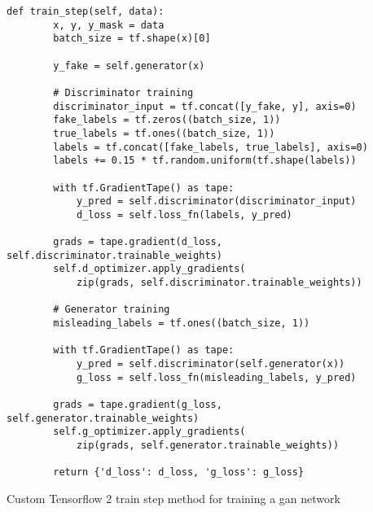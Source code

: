 \begin{listing}
\begin{verbatim}
def train_step(self, data):
        x, y, y_mask = data
        batch_size = tf.shape(x)[0]

        y_fake = self.generator(x)

        # Discriminator training
        discriminator_input = tf.concat([y_fake, y], axis=0)
        fake_labels = tf.zeros((batch_size, 1))
        true_labels = tf.ones((batch_size, 1))
        labels = tf.concat([fake_labels, true_labels], axis=0)
        labels += 0.15 * tf.random.uniform(tf.shape(labels))

        with tf.GradientTape() as tape:
            y_pred = self.discriminator(discriminator_input)
            d_loss = self.loss_fn(labels, y_pred)

        grads = tape.gradient(d_loss, self.discriminator.trainable_weights)
        self.d_optimizer.apply_gradients(
            zip(grads, self.discriminator.trainable_weights))

        # Generator training
        misleading_labels = tf.ones((batch_size, 1))

        with tf.GradientTape() as tape:
            y_pred = self.discriminator(self.generator(x))
            g_loss = self.loss_fn(misleading_labels, y_pred)

        grads = tape.gradient(g_loss, self.generator.trainable_weights)
        self.g_optimizer.apply_gradients(
            zip(grads, self.generator.trainable_weights))

        return {'d_loss': d_loss, 'g_loss': g_loss}
\end{verbatim}
\caption{Custom Tensorflow 2 train step method for training a \gls{gan} network}
\label{lst:train_step_gan}
\end{listing}

